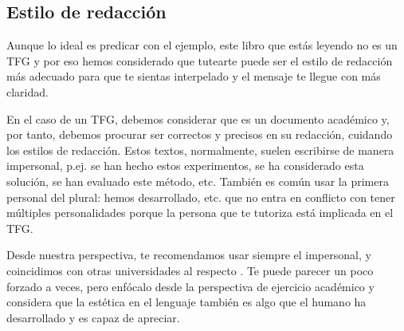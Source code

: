 {\subsection{Estilo de redacción} %



Aunque lo ideal es predicar con el ejemplo, este libro que estás leyendo no es un TFG y por eso hemos considerado que tutearte puede ser el estilo de redacción más adecuado para que te sientas interpelado y el mensaje te llegue con más claridad. 

En el caso de un TFG, debemos considerar que es un documento académico y, por tanto, debemos procurar ser correctos y precisos en su redacción, cuidando los estilos de redacción. Estos textos, normalmente, suelen escribirse de manera impersonal, p.ej. se han hecho estos experimentos, se ha considerado esta solución, se han evaluado este método, etc. También es común usar la primera personal del plural: hemos desarrollado, etc. que no entra en conflicto con tener múltiples personalidades porque la persona que te tutoriza está implicada en el TFG. 

Desde nuestra perspectiva, te recomendamos usar siempre el impersonal, y coincidimos con otras universidades al respecto \cite{UPC-guia}. Te puede parecer un poco forzado a veces, pero enfócalo desde la perspectiva de ejercicio académico y considera que la estética en el lenguaje también es algo que el humano ha desarrollado y es capaz de apreciar.

}
